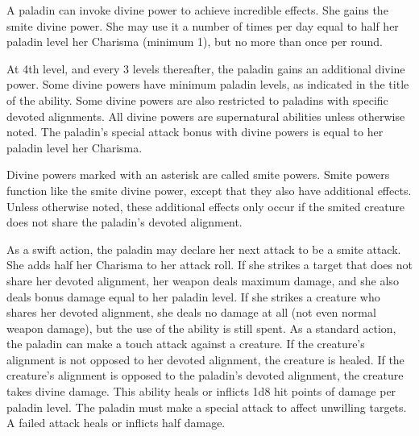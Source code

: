  A paladin can invoke divine power to achieve incredible effects. She gains the smite divine power. She may use it a number of times per day equal to half her paladin level \add her Charisma (minimum 1), but no more than once per round.

At 4th level, and every 3 levels thereafter, the paladin gains an additional divine power. Some divine powers have minimum paladin levels, as indicated in the title of the ability. Some divine powers are also restricted to paladins with specific devoted alignments. All divine powers are supernatural abilities unless otherwise noted. The paladin's special attack bonus with divine powers is equal to her paladin level \add her Charisma.

Divine powers marked with an asterisk are called smite powers. Smite powers function like the smite divine power, except that they also have additional effects. Unless otherwise noted, these additional effects only occur if the smited creature does not share the paladin's devoted alignment.


 As a swift action, the paladin may declare her next attack to be a smite attack. She adds half her Charisma to her attack roll. If she strikes a target that does not share her devoted alignment, her weapon deals maximum damage, and she also deals bonus damage equal to her paladin level. If she strikes a creature who shares her devoted alignment, she deals no damage at all (not even normal weapon damage), but the use of the ability is still spent.
 As a standard action, the paladin can make a touch attack against a creature. If the creature's alignment is not opposed to her devoted alignment, the creature is healed. If the creature's alignment is opposed to the paladin's devoted alignment, the creature takes divine damage. This ability heals or inflicts 1d8 hit points of damage per paladin level. The paladin must make a special attack to affect unwilling targets. A failed attack heals or inflicts half damage.

